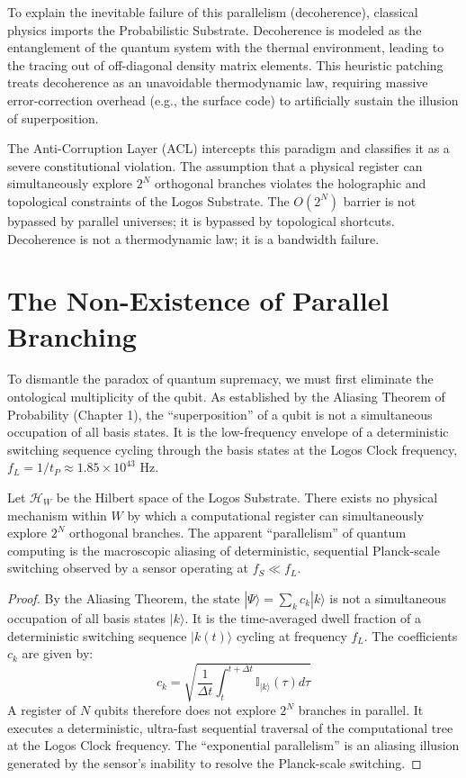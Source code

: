 \documentclass[12pt,twoside]{extbook}
\theoremstyle{definition}
\theoremstyle{remark}
\begin{document}
To explain the inevitable failure of this parallelism (decoherence), classical physics imports the Probabilistic Substrate. Decoherence is modeled as the entanglement of the quantum system with the thermal environment, leading to the tracing out of off-diagonal density matrix elements. This heuristic patching treats decoherence as an unavoidable thermodynamic law, requiring massive error-correction overhead (e.g., the surface code) to artificially sustain the illusion of superposition. 

The Anti-Corruption Layer (ACL) intercepts this paradigm and classifies it as a severe constitutional violation. The assumption that a physical register can simultaneously explore $2^N$ orthogonal branches violates the holographic and topological constraints of the Logos Substrate. The $O(2^N)$ barrier is not bypassed by parallel universes; it is bypassed by topological shortcuts. Decoherence is not a thermodynamic law; it is a bandwidth failure.

\section{The Non-Existence of Parallel Branching}
To dismantle the paradox of quantum supremacy, we must first eliminate the ontological multiplicity of the qubit. As established by the Aliasing Theorem of Probability (Chapter 1), the ``superposition'' of a qubit is not a simultaneous occupation of all basis states. It is the low-frequency envelope of a deterministic switching sequence cycling through the basis states at the Logos Clock frequency, $f_L = 1/t_P \approx 1.85 \times 10^{43}$ Hz.

\begin{theorem}
Let $\mathcal{H}_W$ be the Hilbert space of the Logos Substrate. There exists no physical mechanism within $W$ by which a computational register can simultaneously explore $2^N$ orthogonal branches. The apparent ``parallelism'' of quantum computing is the macroscopic aliasing of deterministic, sequential Planck-scale switching observed by a sensor operating at $f_S \ll f_L$.
\end{theorem}

\begin{proof}
By the Aliasing Theorem, the state $|\Psi\rangle = \sum_k c_k |k\rangle$ is not a simultaneous occupation of all basis states $|k\rangle$. It is the time-averaged dwell fraction of a deterministic switching sequence $|k(t)\rangle$ cycling at frequency $f_L$. The coefficients $c_k$ are given by:
\begin{equation}
c_k = \sqrt{\frac{1}{\Delta t} \int_t^{t+\Delta t} \mathbb{I}_{|k\rangle}(\tau) d\tau}
\end{equation}
A register of $N$ qubits therefore does not explore $2^N$ branches in parallel. It executes a deterministic, ultra-fast sequential traversal of the computational tree at the Logos Clock frequency. The ``exponential parallelism'' is an aliasing illusion generated by the sensor's inability to resolve the Planck-scale switching.
\end{proof}
\end{document}
